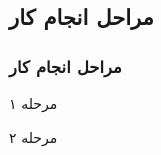 \label{study-how_its_done}

\subsection{مراحل انجام کار}
\begin{frame}
\frametitle{مراحل انجام کار}

\pause
{}

\begin{enumerate}\raggedleft
\begin{RTLitems}
\item 
مرحله ۱
\pause
\item 
مرحله ۲
\pause
\end{RTLitems}
\end{enumerate}

\end{frame}
